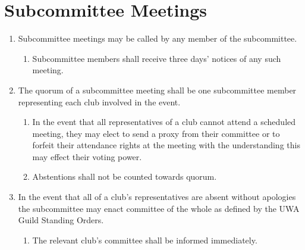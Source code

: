 \documentclass[a4paper]{article}
\newenvironment{enumsection}[1]{\section{#1} \begin{enumerate}[ref=\thesection.\theenumi]}{\end{enumerate}}
\begin{document}
\begin{enumsection}{Subcommittee Meetings}
    \item Subcommittee meetings may be called by any member of the subcommittee.
    \begin{enumerate}
        \item Subcommittee members shall receive three days' notices of any such meeting.
    \end{enumerate}
    \item The quorum of a subcommittee meeting shall be one subcommittee member representing each club involved in the event.
    \begin{enumerate}
        \item In the event that all representatives of a club cannot attend a scheduled meeting, they may elect to send a proxy from their committee or to forfeit their attendance rights at the meeting with the understanding this may effect their voting power.
        \item Abstentions shall not be counted towards quorum.
    \end{enumerate}
    \item In the event that all of a club's representatives are absent without apologies the subcommittee may enact committee of the whole as defined by the UWA Guild Standing Orders.
    \begin{enumerate}
        \item The relevant club's committee shall be informed immediately.
    \end{enumerate}
\end{enumsection}
\end{document}
